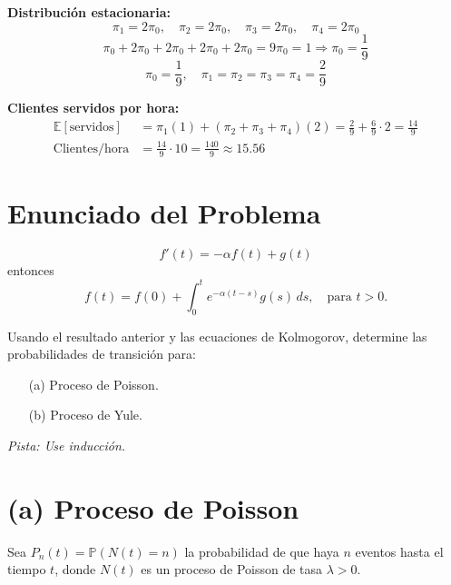 \documentclass[10pt]{article}
\begin{document}
\textbf{Distribución estacionaria:}
\begin{equation*}
\pi_1 = 2\pi_0, \quad \pi_2 = 2\pi_0, \quad \pi_3 = 2\pi_0, \quad \pi_4 = 2\pi_0
\end{equation*}
\begin{equation*}
\pi_0 + 2\pi_0 + 2\pi_0 + 2\pi_0 + 2\pi_0 = 9\pi_0 = 1 \Rightarrow \pi_0 = \frac{1}{9}
\end{equation*}
\begin{equation*}
\boxed{\pi_0 = \frac{1}{9}, \quad \pi_1 = \pi_2 = \pi_3 = \pi_4 = \frac{2}{9}}
\end{equation*}

\textbf{Clientes servidos por hora:}
\begin{align*}
\mathbb{E}[\text{servidos}] &= \pi_1(1) + (\pi_2 + \pi_3 + \pi_4)(2) = \frac{2}{9} + \frac{6}{9} \cdot 2 = \frac{14}{9} \\
\text{Clientes/hora} &= \frac{14}{9} \cdot 10 = \boxed{\frac{140}{9} \approx 15.56}
\end{align*}

\section*{Enunciado del Problema}

\begin{equation*}
f'(t) = -\alpha f(t) + g(t)
\end{equation*}
entonces
\begin{equation*}
f(t) = f(0) + \int_0^t e^{-\alpha(t-s)} g(s) \, ds, \quad \text{para } t > 0.
\end{equation*}

Usando el resultado anterior y las ecuaciones de Kolmogorov, determine las probabilidades de transición para:

\begin{itemize}
    \item[(a)] Proceso de Poisson.
    \item[(b)] Proceso de Yule.
\end{itemize}

\textit{Pista: Use inducción.}

\vspace{0.5cm}

\section*{(a) Proceso de Poisson}

Sea $P_n(t) = \mathbb{P}(N(t) = n)$ la probabilidad de que haya $n$ eventos hasta el tiempo $t$, donde $N(t)$ es un proceso de Poisson de tasa $\lambda > 0$.
\end{document}
